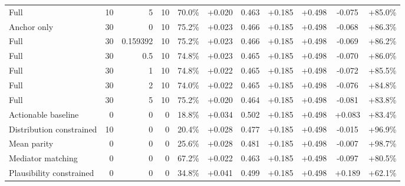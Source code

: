 \begin{table}[htbp]
\begin{tabular}{lrrrccccccc}
Full & 10 & 5 & 10 & 70.0\% & +0.020 & 0.463 & +0.185 & +0.498 & -0.075 & +85.0\% \\
Anchor only & 30 & 0 & 10 & 75.2\% & +0.023 & 0.466 & +0.185 & +0.498 & -0.068 & +86.3\% \\
Full & 30 & 0.159392 & 10 & 75.2\% & +0.023 & 0.466 & +0.185 & +0.498 & -0.069 & +86.2\% \\
Full & 30 & 0.5 & 10 & 74.8\% & +0.023 & 0.465 & +0.185 & +0.498 & -0.070 & +86.0\% \\
Full & 30 & 1 & 10 & 74.8\% & +0.022 & 0.465 & +0.185 & +0.498 & -0.072 & +85.5\% \\
Full & 30 & 2 & 10 & 74.0\% & +0.022 & 0.465 & +0.185 & +0.498 & -0.076 & +84.8\% \\
Full & 30 & 5 & 10 & 75.2\% & +0.020 & 0.464 & +0.185 & +0.498 & -0.081 & +83.8\% \\
Actionable baseline & 0 & 0 & 0 & 18.8\% & +0.034 & 0.502 & +0.185 & +0.498 & +0.083 & +83.4\% \\
Distribution constrained & 10 & 0 & 0 & 20.4\% & +0.028 & 0.477 & +0.185 & +0.498 & -0.015 & +96.9\% \\
Mean parity & 0 & 0 & 0 & 25.6\% & +0.028 & 0.481 & +0.185 & +0.498 & -0.007 & +98.7\% \\
Mediator matching & 0 & 0 & 0 & 67.2\% & +0.022 & 0.463 & +0.185 & +0.498 & -0.097 & +80.5\% \\
Plausibility constrained & 0 & 0 & 0 & 34.8\% & +0.041 & 0.499 & +0.185 & +0.498 & +0.189 & +62.1\% \\
\bottomrule
\end{tabular}
\end{table}